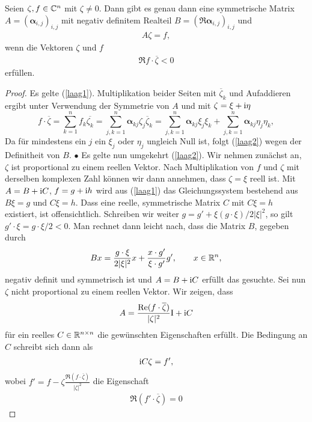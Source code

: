 \begin{lem}\label{lem3}
Seien $\zeta, f \in \mathbb C^n$ mit $\zeta \neq 0$. Dann gibt es genau dann eine symmetrische Matrix $A = (\boldsymbol\alpha_{i,j})_{i,j}$ mit negativ definitem Realteil
$B=(\Re\boldsymbol \alpha_{i,j})_{i,j}$ und
\begin{align}\label{laag1}
   A \zeta = f,
\end{align}
wenn die Vektoren $\zeta$ und $f$
\begin{align} \label{laag2}
\Re f\cdot \overline \zeta < 0
\end{align}
erfüllen.
\end{lem}
\begin{proof}
Es gelte (\ref{laag1}). Multiplikation beider Seiten mit $\overline \zeta_k$ und Aufaddieren ergibt unter Verwendung der Symmetrie von $A$
und mit $\zeta=\xi+\mathrm i\eta$
\[
 f\cdot \overline \zeta = \sum_{k=1}^{n}f_k \overline{\zeta_k} = \sum_{j,k=1}^{n} \boldsymbol\alpha_{kj} \zeta_j \overline \zeta_k
=  \sum_{j,k=1}^{n} \boldsymbol\alpha_{kj} \xi_j \xi_k +  \sum_{j,k=1}^{n} \boldsymbol\alpha_{kj} \eta_j \eta_k,
\]
Da für mindestens ein $j$ ein $\xi_j$ oder $\eta_j$ ungleich Null ist, folgt (\ref{laag2}) wegen der Definitheit von $B$. $\bullet$\qquad 
Es gelte nun umgekehrt (\ref{laag2}). Wir nehmen zunächst an, $\zeta$ ist proportional zu einem reellen Vektor. Nach Multiplikation von $f$ und $\zeta$ mit derselben komplexen Zahl können wir dann annehmen, dass $\zeta=\xi$ reell ist. Mit $A = B + \mathrm i C$, $f= g+\mathrm i h$ wird aus (\ref{laag1}) das Gleichungssystem bestehend aus $B \xi = g$ und $C \xi = h$. Dass eine reelle, symmetrische Matrix $C$ mit $C \xi = h$ existiert, ist offensichtlich. Schreiben wir weiter $g = g' + \xi (g\cdot \xi)/ 2 |\xi|^2$, so gilt $g'\cdot\xi = g\cdot\xi /2 < 0$. Man rechnet dann leicht nach, dass die Matrix $B$, gegeben durch
\[
B x = \dfrac{g\cdot\xi }{2|\xi|^2} x + \dfrac{x\cdot g'}{\xi\cdot g'} g',\qquad x\in\mathbb R^n,
\]
negativ definit und symmetrisch ist und $A=B+\mathrm i C$ erfüllt das gesuchte. Sei nun $\zeta$ nicht proportional zu einem reellen Vektor. Wir zeigen, dass 
\[
A = \dfrac{\operatorname{Re}( f\cdot\overline\zeta )}{|\zeta|^2} \mathrm I + \mathrm i C
\]
für ein reelles $C\in\mathbb R^{n\times n}$ die gewünschten Eigenschaften erfüllt. Die Bedingung an $C$ schreibt sich dann als
\begin{align}
	\mathrm i C \zeta = f',
\end{align}
wobei $f' = f - \zeta \frac{\Re( f\cdot\overline\zeta)}{|\zeta|^2}$ die Eigenschaft
\begin{align}
	\label{Ebene}
\Re (f'\cdot\overline\zeta) = 0

\end{align}
\end{proof}
